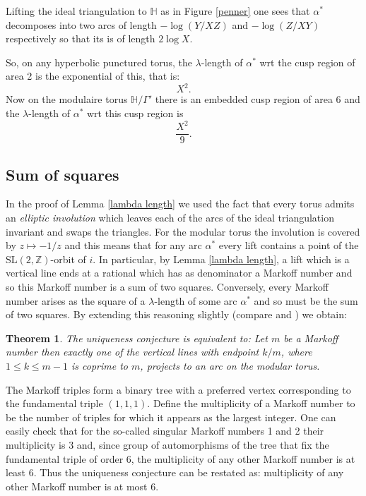 \documentclass[12pt,a4paper]{amsart}
\newtheorem{thm}{Theorem}[section]
\def\HH{\mathbb{H}}
\def\ZZ{\mathbb{Z}}
\def\sl2{\mathrm{SL}(2, \ZZ)}
\begin{document}
Lifting the ideal triangulation to $\HH$ as in Figure \ref{penner}
one sees that  $\alpha^*$ decomposes into two arcs of length
$-\log(Y/XZ)$ and $-\log(Z/XY)$ respectively
so that its is of length $2\log X$.

So, on any hyperbolic punctured torus,
the $\lambda$-length of $\alpha^*$ wrt the cusp region of area 2 is
the exponential of this, that is:
$$ X^2.$$
Now on the modulaire torus $\HH/\Gamma'$ there is an embedded cusp 
region of area 6 and the $\lambda$-length of $\alpha^*$ wrt this cusp region
is
$$ \frac{X^2}{9}.$$



\subsection{Sum of squares}\label{frobenius}


In the proof of Lemma \ref{lambda length} we used the fact that every torus
admits an \textit{elliptic involution} which leaves each of the arcs of the
ideal triangulation  invariant and swaps the triangles. For the modular torus
the involution is covered by $z \mapsto -1/z$ and  this means that for any arc
$\alpha^*$ every lift contains a point of the $\sl2$-orbit of $i$. In
particular, by Lemma \ref{lambda length}, a lift which is a vertical line ends
at a rational which has as denominator a Markoff number and so this Markoff
number is a sum of two squares. Conversely, every Markoff number arises as the
square of a $\lambda$-length of some arc  $\alpha^*$ and so must be the sum of
two squares. By extending this reasoning slightly (compare \cite{mcp} and
\cite{spring}) we obtain:
 
 \begin{thm}
The uniqueness conjecture is equivalent to: \newline
Let $m$ be a Markoff number then exactly one of the vertical lines
with endpoint  $k/m$, where $1\leq k \leq m-1$ is coprime to $m$,
projects to an arc on the modular torus.
\end{thm}

\proof The Markoff triples form a binary tree with a preferred vertex
corresponding to the fundamental triple $(1,1,1)$. Define the multiplicity of a
Markoff number to be the  number of triples for which it appears as the largest
integer. One can easily check that for the so-called singular Markoff numbers 1
and 2 their multiplicity is 3 and, since group of automorphisms of the tree
that fix the fundamental triple of order 6, the multiplicity of any other
Markoff number is at least $6$. Thus the uniqueness conjecture can be restated as:
multiplicity of any other Markoff number is at most $6$.
\end{document}
